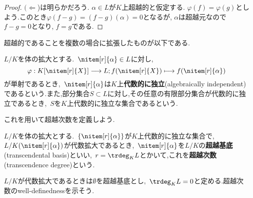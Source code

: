 \begin{proof}
	$(\Longleftarrow$)は明らかだろう. $\alpha\in L$が$K$上超越的と仮定する. $\varphi(f)=\varphi(g)$としよう.このとき$\varphi(f-g)=(f-g)(\alpha)=0$となるが, $\alpha$は超越元なので$f-g=0$となり, $f=g$である.
\end{proof}

超越的であることを複数の場合に拡張したものが以下である.

\begin{defi}[代数的に独立]
	$L/K$を体の拡大とする.~$\nitem[r]{\alpha}\in L$に対し,
	\[\varphi:K[\nitem[r]{X}]\longrightarrow L;f(\nitem[r]{X})\longmapsto f(\nitem[r]{\alpha})\]
	が単射であるとき,~$\nitem[r]{\alpha}$は$K$上\textbf{代数的に独立}(algebraically independent)であるという.また,部分集合$S\subset L$に対し,その任意の有限部分集合が代数的に独立であるとき,~$S$を$K$上代数的に独立な集合であるという.
\end{defi}

これを用いて超越次数を定義しよう.

\begin{defi}[超越基底]
	$L/K$を体の拡大とする.~$\{\nitem[r]{\alpha}\}$が$K$上代数的に独立な集合で,~$L/K(\nitem[r]{\alpha})$が代数拡大であるとき,~$\nitem[r]{\alpha}$を$L/K$の\textbf{超越基底}(transcendental basis)といい,~$r=\trdeg_K L$とかいて,これを\textbf{超越次数}(transcendence degree)という.
\end{defi}

$L/K$が代数拡大であるときは$\emptyset$を超越基底とし,~$\trdeg_K L=0$と定める.超越次数のwell-definednessを示そう.

